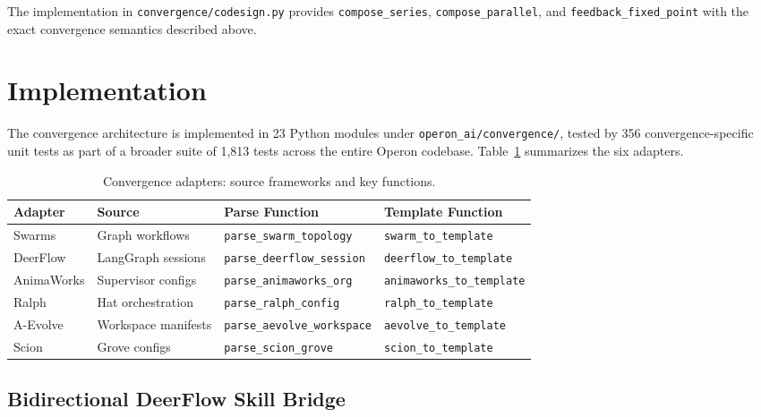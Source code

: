 \documentclass[11pt]{article}
\begin{document}
The implementation in \texttt{convergence/codesign.py} provides
\texttt{compose\_series}, \texttt{compose\_parallel}, and
\texttt{feedback\_fixed\_point} with the exact convergence semantics
described above.

\section{Implementation}\label{sec:impl}

The convergence architecture is implemented in 23 Python modules under
\texttt{operon\_ai/convergence/}, tested by 356 convergence-specific unit
tests as part of a broader suite of 1{,}813 tests across the entire Operon
codebase.  Table~\ref{tab:adapters} summarizes the six adapters.

\begin{table}[ht]
\centering
\caption{Convergence adapters: source frameworks and key functions.}
\label{tab:adapters}
\small
\begin{tabular}{@{}llll@{}}
\toprule
\textbf{Adapter} & \textbf{Source} & \textbf{Parse Function} & \textbf{Template Function} \\
\midrule
Swarms      & Graph workflows     & \texttt{parse\_swarm\_topology}      & \texttt{swarm\_to\_template} \\
DeerFlow    & LangGraph sessions  & \texttt{parse\_deerflow\_session}    & \texttt{deerflow\_to\_template} \\
AnimaWorks  & Supervisor configs  & \texttt{parse\_animaworks\_org}      & \texttt{animaworks\_to\_template} \\
Ralph       & Hat orchestration   & \texttt{parse\_ralph\_config}        & \texttt{ralph\_to\_template} \\
A-Evolve    & Workspace manifests & \texttt{parse\_aevolve\_workspace}   & \texttt{aevolve\_to\_template} \\
Scion       & Grove configs       & \texttt{parse\_scion\_grove}         & \texttt{scion\_to\_template} \\
\bottomrule
\end{tabular}
\end{table}

\subsection{Bidirectional DeerFlow Skill Bridge}
\end{document}
